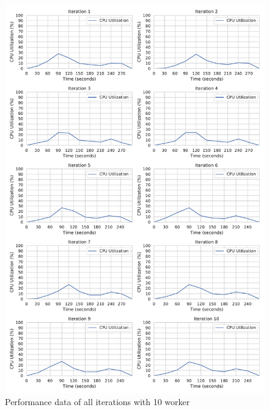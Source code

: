 \begin{figure}[h]
\centering
\includegraphics[scale=0.4]{images/07_evaluation/regression/10_worker_cpu_performance}
\caption{Performance data of all iterations with 10 worker}
\label{fig:appendix_eval_regression_static10}
\end{figure}

